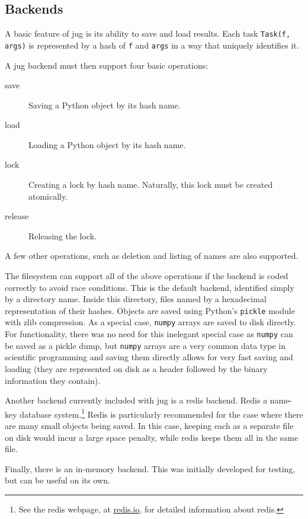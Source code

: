 \documentclass{article}
\let\code\texttt
\begin{document}
\subsection{Backends}

A basic feature of jug is its ability to save and load results. Each task
\code{Task(f, args)} is represented by a hash of \code{f} and \code{args} in a
way that uniquely identifies it.

A jug backend must then support four basic operations:

\begin{description}
\item[save] Saving a Python object by its hash name.
\item[load] Loading a Python object by its hash name.
\item[lock] Creating a lock by hash name. Naturally, this lock must be created
atomically.
\item[release] Releasing the lock.
\end{description}

A few other operations, such as deletion and listing of names are also
supported.

The filesystem can support all of the above operations if the backend is coded
correctly to avoid race conditions. This is the default backend, identified
simply by a directory name. Inside this directory, files named by a hexadecimal
representation of their hashes. Objects are saved using Python's \code{pickle}
module with zlib compression. As a special case, \code{numpy} arrays
\citep{numpy} are saved to disk directly. For functionality, there was no need
for this inelegant special case as \code{numpy} can be saved as a pickle dump,
but \code{numpy} arrays are a very common data type in scientific programming
and saving them directly allows for very fast saving and loading (they are
represented on disk as a header followed by the binary information they
contain).

Another backend currently included with jug is a redis backend. Redis a
name-key database system.\footnote{See the redis webpage, at
\href{http://redis.io}{redis.io}, for detailed information about redis.} Redis
is particularly recommended for the case where there are many small objects
being saved. In this case, keeping each as a separate file on disk would incur
a large space penalty, while redis keeps them all in the same file.

Finally, there is an in-memory backend. This was initially developed for
testing, but can be useful on its own.
\end{document}
